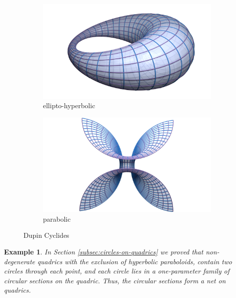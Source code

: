 \documentclass[10pt, a4paper]{article}
\theoremstyle{BoldTopSpacing}
\theoremstyle{BoldTopSpacing}
\theoremstyle{BoldTopSpacing}
\theoremstyle{BoldTopBottomSpacing}
\theoremstyle{BoldTopSpacing}
\theoremstyle{BoldTopBottomSpacing}
\newtheorem{example}{Example}[section]
\theoremstyle{remark}
\begin{document}
\begin{figure}[H]
  \begin{subfigure}[b]{0.5\textwidth}
    \includegraphics[width=\textwidth]{Dupin-net.png}
    \caption{ellipto-hyperbolic}
    \label{fig:ellipto-hyperbolic-cyclides}
  \end{subfigure}
  \hfill
  \begin{subfigure}[b]{0.5\textwidth}
    \includegraphics[width=\textwidth]{Dupin-net-2.png}
    \caption{parabolic}
    \label{fig:parabolic-cyclides}
  \end{subfigure}
  \caption{Dupin Cyclides}
\end{figure}

\begin{example}
\label{ex:circular-sections-form-nets-on-quadrics}
In Section \ref{subsec:circles-on-quadrics} we proved that non-degenerate quadrics \textemdash with the exclusion of hyperbolic paraboloids, contain two circles through each point, and each circle lies in a one-parameter family of circular sections on the quadric. Thus, the circular sections form a net on quadrics.
\end{example}
\end{document}
